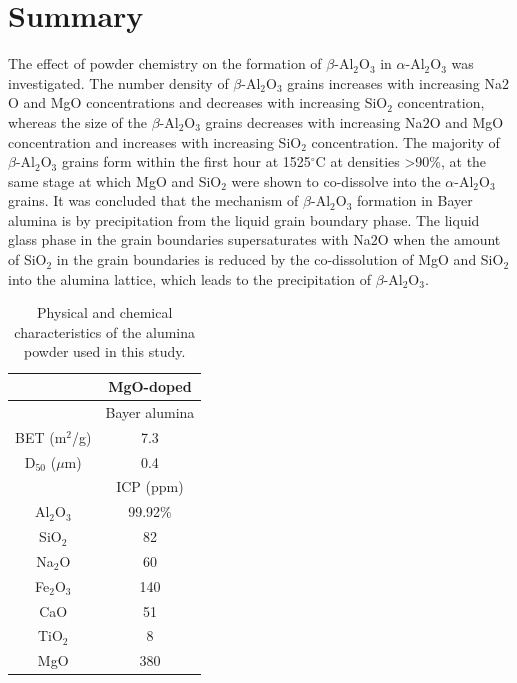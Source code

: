 \section{Summary}
The effect of powder chemistry on the formation of $\beta$-Al$_{2}$O$_{3}$ in $\alpha$-Al$_{2}$O$_{3}$ was investigated. The number density of $\beta$-Al$_{2}$O$_{3}$ grains increases with increasing Na${2}$O and MgO concentrations and decreases with increasing SiO$_{2}$ concentration, whereas the size of the $\beta$-Al$_{2}$O$_{3}$ grains decreases with increasing Na${2}$O and MgO concentration and increases with increasing SiO$_{2}$ concentration. The majority of $\beta$-Al$_{2}$O$_{3}$ grains form within the first hour at 1525$^{\circ}$C at densities >90\%, at the same stage at which MgO and SiO$_{2}$ were shown to co-dissolve into the $\alpha$-Al$_{2}$O$_{3}$ grains. It was concluded that the mechanism of $\beta$-Al$_{2}$O$_{3}$ formation in Bayer alumina is by precipitation from the liquid grain boundary phase. The liquid glass phase in the grain boundaries supersaturates with Na${2}$O when the amount of SiO$_{2}$ in the grain boundaries is reduced by the co-dissolution of MgO and SiO$_{2}$ into the alumina lattice, which leads to the precipitation of $\beta$-Al$_{2}$O$_{3}$.


\newpage
\begin{table}[H]
	\caption{Physical and chemical characteristics of the alumina powder used in this study.}
	\centering
	\begin{tabular}{ | c | c | }
		\hline
		& MgO-doped \\
		\hline
		& Bayer alumina \\
		\hline
		BET (m$^{2}$/g) & 7.3 \\
		\hline
		D$_{50}$ ($\mu$m) & 0.4 \\
		\hline
		& ICP (ppm) \\
		\hline
		Al$_{2}$O$_{3}$ & 99.92\%\\
		\hline
		SiO$_{2}$ & 82\\
		\hline
		Na$_{2}$O & 60\\
		\hline
		Fe$_{2}$O$_{3}$ & 140 \\
		\hline
		CaO & 51 \\
		\hline
		TiO$_{2}$ & 8 \\
		\hline
		MgO & 380\\
		\hline
	\end{tabular}
	\label{Ch5-table:table1}
\end{table}
\clearpage

